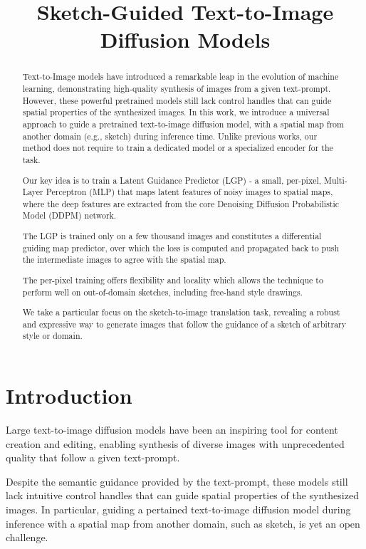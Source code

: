 \title{Sketch-Guided Text-to-Image Diffusion Models}

\begin{abstract}
Text-to-Image models have introduced a remarkable leap in the evolution of machine learning, demonstrating high-quality synthesis of images from a given text-prompt. However, these powerful pretrained models still lack control handles that can guide spatial properties of the synthesized images. In this work, we introduce a universal approach to guide a pretrained text-to-image diffusion model, with a spatial map from another domain (e.g., sketch) during inference time. Unlike previous works, our method does not require to train a dedicated model or a specialized encoder for the task.

Our key idea is to train a Latent Guidance Predictor (LGP) - a small, per-pixel, Multi-Layer Perceptron (MLP) that maps latent features of noisy images to spatial maps, where the deep features are extracted from the core Denoising Diffusion Probabilistic Model (DDPM) network.

The LGP is trained only on a few thousand images and constitutes a differential guiding map predictor, over which the loss is computed and propagated back to push the intermediate images to agree with the spatial map.

The per-pixel training offers flexibility and locality which allows the technique to perform well on out-of-domain sketches, including free-hand style drawings.

We take a particular focus on the sketch-to-image translation task, revealing a robust and expressive way to generate images that follow the guidance of a sketch of arbitrary style or domain.
\end{abstract}

\section{Introduction}

Large text-to-image diffusion models \cite{ramesh2022hierarchical,saharia2022photorealistic,rombach2021highresolution} have been an inspiring tool for content creation and editing, enabling synthesis of diverse images with unprecedented quality that follow a given text-prompt.

Despite the semantic guidance provided by the text-prompt, these models still lack intuitive control handles that can guide spatial properties of the synthesized images. In particular, guiding a pertained text-to-image diffusion model during inference with a spatial map from another domain, such as sketch, is yet an open challenge.

